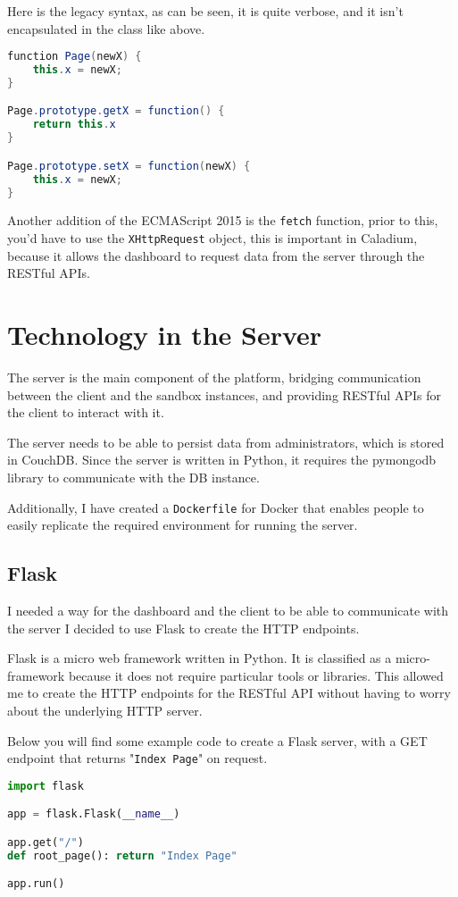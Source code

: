 Here is the legacy syntax, as can be seen, it is quite verbose,
and it isn't encapsulated in the class like above.

\begin{lstlisting}[language=Java]
function Page(newX) {
    this.x = newX;
}

Page.prototype.getX = function() {
    return this.x
}

Page.prototype.setX = function(newX) {
    this.x = newX;
}
\end{lstlisting}

Another addition of the ECMAScript 2015 is the \texttt{fetch} function,
prior to this, you'd have to use the \texttt{XHttpRequest} object,
this is important in Caladium, because it allows the dashboard to request data from the server through the RESTful APIs.


\section{Technology in the Server}
The server is the main component of the platform,
bridging communication between the client and the sandbox instances, 
and providing RESTful APIs for the client to interact with it.

The server needs to be able to persist data from administrators, 
which is stored in CouchDB. Since the server is written in Python,
it requires the pymongodb library to communicate with the DB instance.

Additionally, I have created a \texttt{Dockerfile} for Docker
that enables people to easily replicate the required
environment for running the server.

\subsection{Flask}
I needed a way for the dashboard and the client to be
able to communicate with the server
I decided to use Flask to create the HTTP endpoints.

Flask is a micro web framework written in Python.
It is classified as a micro-framework because it does
not require particular tools or libraries.
This allowed me to create the HTTP endpoints for the RESTful API without
having to worry about the underlying HTTP server.

Below you will find some example code to create a Flask server,
with a GET endpoint that returns "\texttt{Index Page}" on request.

\begin{lstlisting}[language=Python]
import flask

app = flask.Flask(__name__)

app.get("/")
def root_page(): return "Index Page"

app.run()
\end{lstlisting}


